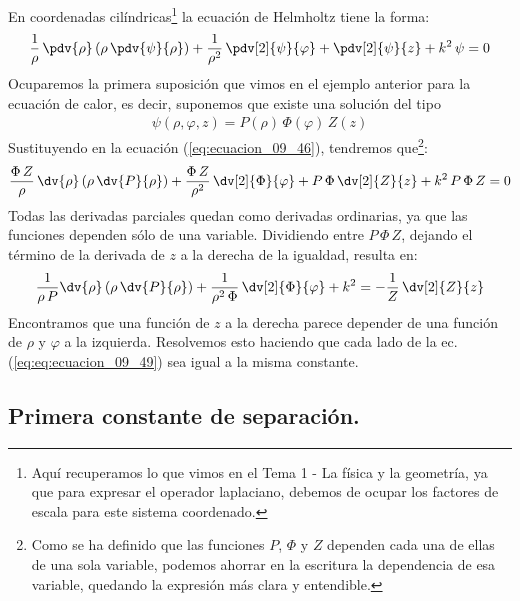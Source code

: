 En coordenadas cilíndricas\footnote{Aquí recuperamos lo que vimos en el Tema 1 - La física y la geometría, ya que para expresar el operador laplaciano, debemos de ocupar los factores de escala para este sistema coordenado.} la ecuación de Helmholtz tiene la forma:
\begin{align}
\dfrac{1}{\rho} \, \pdv{\rho} \left( \rho \, \pdv{\psi}{\rho} \right) + \dfrac{1}{\rho^{2}} \, \pdv[2]{\psi}{\varphi} + \pdv[2]{\psi}{z} + k^{2} \, \psi = 0
\label{eq:ecuacion_09_46}
\end{align}
Ocuparemos la primera suposición que vimos en el ejemplo anterior para la ecuación de calor, es decir, suponemos que existe una solución del tipo
\begin{align}
\psi (\rho, \varphi, z) = P (\rho) \, \Phi (\varphi) \, Z (z)
\label{eq:ecuacion_09_47}
\end{align}
Sustituyendo en la ecuación (\ref{eq:ecuacion_09_46}), tendremos que\footnote{Como se ha definido que las funciones $P$, $\Phi$ y $Z$ dependen cada una de ellas de una sola variable, podemos ahorrar en la escritura la dependencia de esa variable, quedando la expresión más clara y entendible.}:
\begin{align}
\dfrac{\Phi \, Z}{\rho} \, \dv{\rho} \left( \rho \, \dv{P}{\rho} \right) + \dfrac{\Phi \, Z}{\rho^{2}} \, \dv[2]{\Phi}{\varphi} + P \, \Phi \, \dv[2]{Z}{z} + k^{2} \, P \, \Phi \, Z = 0 
\label{eq:ecuacion_09_48}    
\end{align}
Todas las derivadas parciales quedan como derivadas ordinarias, ya que las funciones dependen sólo de una variable. Dividiendo entre $P \, \Phi \, Z$, dejando el término de la derivada de $z$ a la derecha de la igualdad, resulta en:
\begin{align}
\dfrac{1}{\rho \, P} \dv{\rho} \left( \rho \, \dv{P}{\rho} \right) + \dfrac{1}{\rho^{2} \, \Phi} \, \dv[2]{\Phi}{\varphi} + k^{2} =  - \dfrac{1}{Z} \, \dv[2]{Z}{z}
\label{eq:eq:ecuacion_09_49}
\end{align}
Encontramos que una función de $z$ a la derecha parece depender de una función de $\rho$ y $\varphi$ a la izquierda. Resolvemos esto haciendo que cada lado de la ec. (\ref{eq:eq:ecuacion_09_49}) sea igual a la misma constante.

\subsection{Primera constante de separación.}

